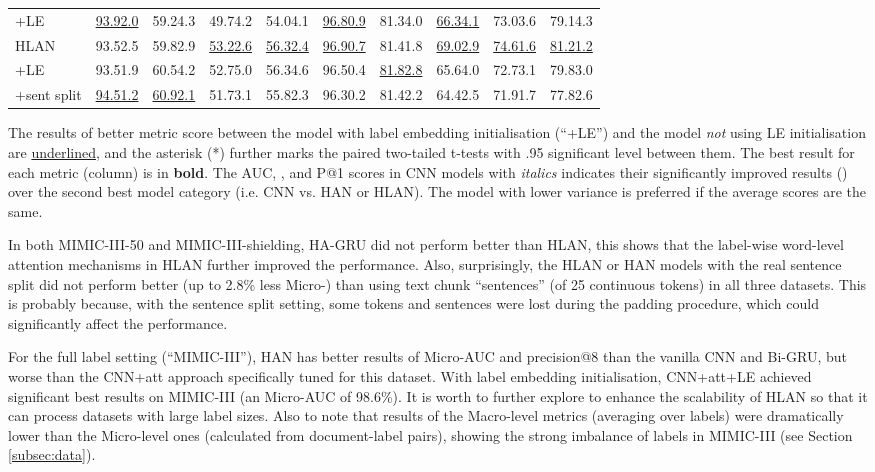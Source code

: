 \documentclass[final,5p,times,twocolumn]{elsarticle}
\begin{document}
\begin{table*}[th]
\begin{threeparttable}
\begin{tabular}{lllll|llll|l}
+LE                   & \underline{93.92.0} & 59.24.3 & 49.74.2 & 54.04.1 & \underline{96.80.9} & 81.34.0 & \underline{66.34.1} & 73.03.6 & 79.14.3 \\
\cline{1-10}
HLAN                  & 93.52.5 & 59.82.9 & \underline{53.22.6} & \underline{56.32.4} & \underline{96.90.7} & 81.41.8 & \underline{69.02.9} & \underline{74.61.6} & \underline{81.21.2} \\
+LE                   & 93.51.9 & 60.54.2 & 52.75.0 & 56.34.6 & 96.50.4 & \underline{81.82.8} & 65.64.0 & 72.73.1 & 79.83.0 \\
+sent split           & \underline{94.51.2} & \underline{60.92.1} & 51.73.1 & 55.82.3 & 96.30.2 & 81.42.2 & 64.42.5 & 71.91.7 & 77.82.6 \\
\cline{1-10}
\end{tabular}
\begin{tablenotes}
\item The results of better metric score between the model with label embedding initialisation (``+LE'') and the model \textit{not} using LE initialisation are \underline{underlined}, and the asterisk (*) further marks the paired two-tailed t-tests with .95 significant level between them. The best result for each metric (column) is in \textbf{bold}. The AUC, , and P@1 scores in CNN models with \textit{italics} indicates their significantly improved results () over the second best model category (i.e. CNN vs. HAN or HLAN). The model with lower variance is preferred if the average scores are the same.
\end{tablenotes}
\end{threeparttable}
\end{table*}

In both MIMIC-III-50 and MIMIC-III-shielding, HA-GRU did not perform better than HLAN, this shows that the label-wise word-level attention mechanisms in HLAN further improved the performance. Also, surprisingly, the HLAN or HAN models with the real sentence split did not perform better (up to 2.8\% less Micro-) than using text chunk ``sentences'' (of 25 continuous tokens) in all three datasets. This is probably because, with the sentence split setting, some tokens and sentences were lost during the padding procedure, which could significantly affect the performance.

For the full label setting (``MIMIC-III''), HAN has better results of Micro-AUC and precision@8 than the vanilla CNN and Bi-GRU, but worse than the CNN+att approach specifically tuned for this dataset. With label embedding initialisation, CNN+att+LE achieved significant best results on MIMIC-III (an Micro-AUC of 98.6\%). It is worth to further explore to enhance the scalability of HLAN so that it can process datasets with large label sizes. Also to note that results of the Macro-level metrics (averaging over labels) were dramatically lower than the Micro-level ones (calculated from document-label pairs), showing the strong imbalance of labels in MIMIC-III (see Section \ref{subsec:data}).
\end{document}
